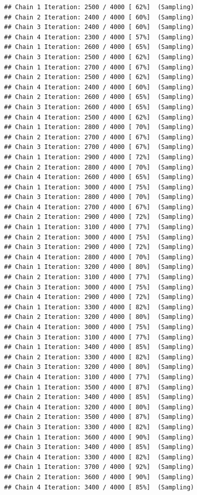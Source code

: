 \documentclass[
]{article}
\begin{document}
\begin{verbatim}
## Chain 1 Iteration: 2500 / 4000 [ 62%]  (Sampling) 
## Chain 2 Iteration: 2400 / 4000 [ 60%]  (Sampling) 
## Chain 3 Iteration: 2400 / 4000 [ 60%]  (Sampling) 
## Chain 4 Iteration: 2300 / 4000 [ 57%]  (Sampling) 
## Chain 1 Iteration: 2600 / 4000 [ 65%]  (Sampling) 
## Chain 3 Iteration: 2500 / 4000 [ 62%]  (Sampling) 
## Chain 1 Iteration: 2700 / 4000 [ 67%]  (Sampling) 
## Chain 2 Iteration: 2500 / 4000 [ 62%]  (Sampling) 
## Chain 4 Iteration: 2400 / 4000 [ 60%]  (Sampling) 
## Chain 2 Iteration: 2600 / 4000 [ 65%]  (Sampling) 
## Chain 3 Iteration: 2600 / 4000 [ 65%]  (Sampling) 
## Chain 4 Iteration: 2500 / 4000 [ 62%]  (Sampling) 
## Chain 1 Iteration: 2800 / 4000 [ 70%]  (Sampling) 
## Chain 2 Iteration: 2700 / 4000 [ 67%]  (Sampling) 
## Chain 3 Iteration: 2700 / 4000 [ 67%]  (Sampling) 
## Chain 1 Iteration: 2900 / 4000 [ 72%]  (Sampling) 
## Chain 2 Iteration: 2800 / 4000 [ 70%]  (Sampling) 
## Chain 4 Iteration: 2600 / 4000 [ 65%]  (Sampling) 
## Chain 1 Iteration: 3000 / 4000 [ 75%]  (Sampling) 
## Chain 3 Iteration: 2800 / 4000 [ 70%]  (Sampling) 
## Chain 4 Iteration: 2700 / 4000 [ 67%]  (Sampling) 
## Chain 2 Iteration: 2900 / 4000 [ 72%]  (Sampling) 
## Chain 1 Iteration: 3100 / 4000 [ 77%]  (Sampling) 
## Chain 2 Iteration: 3000 / 4000 [ 75%]  (Sampling) 
## Chain 3 Iteration: 2900 / 4000 [ 72%]  (Sampling) 
## Chain 4 Iteration: 2800 / 4000 [ 70%]  (Sampling) 
## Chain 1 Iteration: 3200 / 4000 [ 80%]  (Sampling) 
## Chain 2 Iteration: 3100 / 4000 [ 77%]  (Sampling) 
## Chain 3 Iteration: 3000 / 4000 [ 75%]  (Sampling) 
## Chain 4 Iteration: 2900 / 4000 [ 72%]  (Sampling) 
## Chain 1 Iteration: 3300 / 4000 [ 82%]  (Sampling) 
## Chain 2 Iteration: 3200 / 4000 [ 80%]  (Sampling) 
## Chain 4 Iteration: 3000 / 4000 [ 75%]  (Sampling) 
## Chain 3 Iteration: 3100 / 4000 [ 77%]  (Sampling) 
## Chain 1 Iteration: 3400 / 4000 [ 85%]  (Sampling) 
## Chain 2 Iteration: 3300 / 4000 [ 82%]  (Sampling) 
## Chain 3 Iteration: 3200 / 4000 [ 80%]  (Sampling) 
## Chain 4 Iteration: 3100 / 4000 [ 77%]  (Sampling) 
## Chain 1 Iteration: 3500 / 4000 [ 87%]  (Sampling) 
## Chain 2 Iteration: 3400 / 4000 [ 85%]  (Sampling) 
## Chain 4 Iteration: 3200 / 4000 [ 80%]  (Sampling) 
## Chain 2 Iteration: 3500 / 4000 [ 87%]  (Sampling) 
## Chain 3 Iteration: 3300 / 4000 [ 82%]  (Sampling) 
## Chain 1 Iteration: 3600 / 4000 [ 90%]  (Sampling) 
## Chain 3 Iteration: 3400 / 4000 [ 85%]  (Sampling) 
## Chain 4 Iteration: 3300 / 4000 [ 82%]  (Sampling) 
## Chain 1 Iteration: 3700 / 4000 [ 92%]  (Sampling) 
## Chain 2 Iteration: 3600 / 4000 [ 90%]  (Sampling) 
## Chain 4 Iteration: 3400 / 4000 [ 85%]  (Sampling) 

\end{verbatim}
\end{document}

